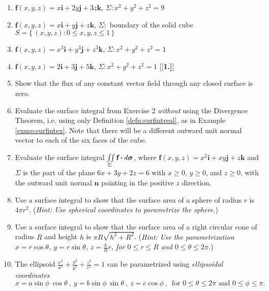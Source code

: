 \begin{enumerate}[\bfseries 1.]
 \item $\textbf{f}(x,y,z) = x\textbf{i} + 2y\textbf{j} + 3z\textbf{k}$, $\Sigma: x^2 + y^2 + z^2 = 9$
 \item $\textbf{f}(x,y,z) = x\textbf{i} + y\textbf{j} + z\textbf{k}$, $\Sigma:$ boundary of the solid cube
  $S = \lbrace\, (x,y,z): 0 \le x,y,z \le 1 \,\rbrace$
 \item $\textbf{f}(x,y,z) = x^3\textbf{i} + y^3\textbf{j} + z^3\textbf{k}$, $\Sigma: x^2 + y^2 + z^2 = 1$
 \item $\textbf{f}(x,y,z) = 2\textbf{i} + 3\textbf{j} + 5\textbf{k}$, $\Sigma: x^2 + y^2 + z^2 = 1$
[{[\bfseries 1.]}]
 \item Show that the flux of any constant vector field through any closed surface is zero.
 \item Evaluate the surface integral from Exercise 2 \emph{without} using the Divergence Theorem, i.e. using only
  Definition \ref{defn:surfintreal}, as in Example \ref{exmp:surfintex}. Note that there will be a different
  outward unit normal vector to each of the six faces of the cube.
 \item Evaluate the surface integral $\iint\limits_{\Sigma} \textbf{f} \bm{\cdot} d\bm{\sigma}$, where
  $\textbf{f}(x,y,z) = x^2 \textbf{i} + xy\textbf{j} + z\textbf{k}$ and $\Sigma$ is the part of the plane $6x+3y+2z=6$
  with $x \ge 0$, $y \ge 0$, and $z \ge 0$, with the outward unit normal $\textbf{n}$ pointing in the positive $z$
  direction.
 \item Use a surface integral to show that the surface area of a sphere of radius $r$ is $4\pi r^2$. (\emph{Hint: Use
  spherical coordinates to parametrize the sphere.})
 \item Use a surface integral to show that the surface area of a right circular cone of radius $R$ and height $h$ is
  $\pi R \sqrt{h^2 + R^2}$. (\emph{Hint: Use the parametrization $x=r\cos\theta$, $y=r\sin\theta$, $z=\frac{h}{R}r$,
  for $0 \le r \le R$ and $0 \le \theta \le 2\pi$.})
 \item The ellipsoid $\frac{x^2}{a^2}+\frac{y^2}{b^2}+\frac{z^2}{c^2}=1$ can be parametrized using
 \emph{ellipsoidal coordinates}
 \begin{displaymath}
  x=a\sin\phi\,\cos\theta ~, ~y=b\sin\phi\,\sin\theta ~, ~z=c\cos\phi~, ~~\text{for $0 \le \theta \le 2\pi$ and
  $0 \le \phi \le \pi$.}
 \end{displaymath}

\end{enumerate}
